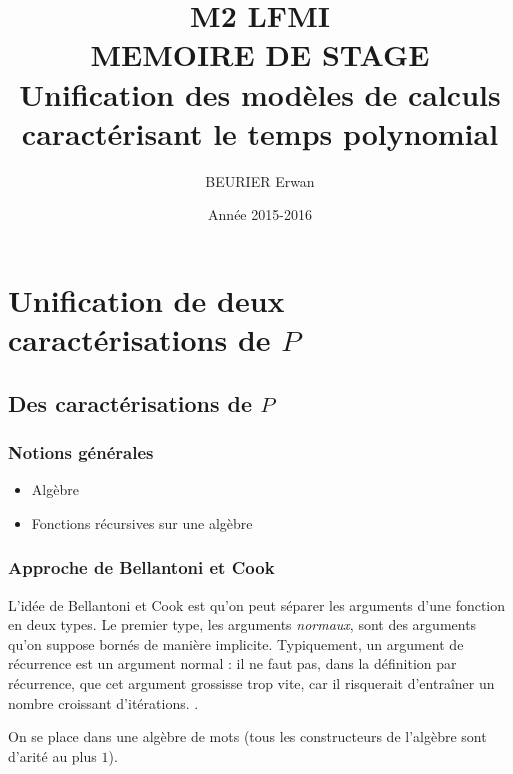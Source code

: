 \documentclass{report}
\author{BEURIER Erwan}
\title{M2 LFMI \\ MEMOIRE DE STAGE \\ Unification des modèles de calculs caractérisant le temps polynomial}
\date{Année 2015-2016}
\begin{document}
	
	\maketitle
	
	\tableofcontents
	
	\pagebreak
	
	\chapter{Unification de deux caractérisations de $P$}
	
	
	\section{Des caractérisations de $P$}
		\label{sec:caracterisations_P}
	
		\subsection{Notions générales}
			\label{subsec:notions_generales}
		
		\begin{itemize}[itemsep=-1mm]
			\item 	Algèbre
			\item 	Fonctions récursives sur une algèbre
		\end{itemize}
		
		
		\subsection{Approche de Bellantoni et Cook}
			\label{subsec:bellantoni_cook}
		
		L'idée de Bellantoni et Cook \cite{BellantoniCook1992} est qu'on peut séparer les arguments d'une fonction en deux types. Le premier type, les arguments \emph{normaux}, sont des arguments qu'on suppose bornés de manière implicite. Typiquement, un argument de récurrence est un argument normal : il ne faut pas, dans la définition par récurrence, que cet argument grossisse trop vite, car il risquerait d'entraîner un nombre croissant d'itérations. .
		
		On se place dans une algèbre de mots (tous les constructeurs de l'algèbre sont d'arité au plus $1$).
		
\end{document}
